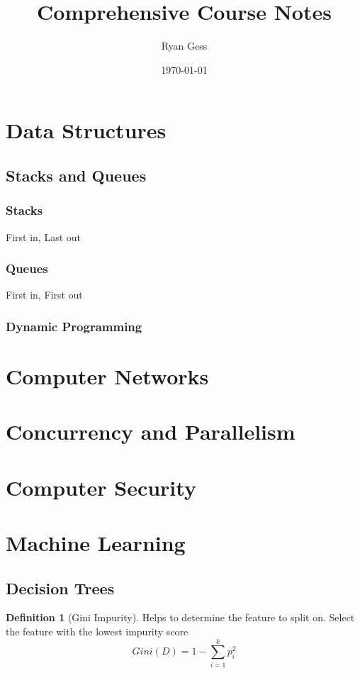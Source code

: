 \documentclass{article}
\title{Comprehensive Course Notes}
\author{Ryan Gess}
\date{\today}
\begin{document}
\maketitle \tableofcontents 
\def\layersep{2.5cm}
\theoremstyle{definition}
\newtheorem{definition}{Definition}[section]



\newpage

\section{Data Structures}

\subsection{Stacks and Queues}
\subsubsection{Stacks}
First in, Last out  
\subsubsection{Queues}
First in, First out

\subsubsection{Dynamic Programming}

\section{Computer Networks}

\section{Concurrency and Parallelism}

\section{Computer Security}

\newpage
\section{Machine Learning}


\subsection{Decision Trees}
\begin{definition}[Gini Impurity]
    Helps to determine the feature to split on. Select the feature with the lowest impurity score
    \[Gini(D) = 1 - \sum^{k}_{i=1} p_i^2\]
\end{definition}
\end{document}
